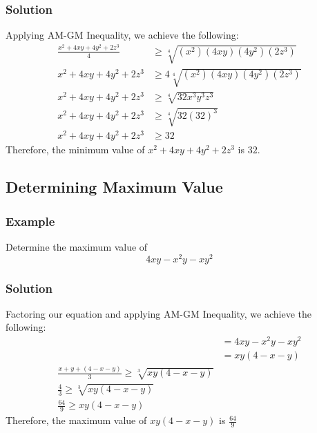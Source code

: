 \documentclass[12pt]{article}
\begin{document}
\subsubsection*{Solution}
Applying AM-GM Inequality, we achieve the following:
\begin{align*}
    \frac{x^2 + 4xy + 4y^2 + 2z^3}{4} &\geq \sqrt[4]{(x^2)(4xy)(4y^2)(2z^3)} \\
    x^2 + 4xy + 4y^2 + 2z^3 &\geq 4 \sqrt[4]{(x^2)(4xy)(4y^2)(2z^3)} \\
    x^2 + 4xy + 4y^2 + 2z^3 &\geq \sqrt[4]{32x^3y^3z^3} \\
    x^2 + 4xy + 4y^2 + 2z^3 &\geq \sqrt[4]{32(32)^3} \\
    x^2 + 4xy + 4y^2 + 2z^3 &\geq 32
\end{align*}
Therefore, the minimum value of $x^2 + 4xy + 4y^2 + 2z^3$ is $32$.

\subsection{Determining Maximum Value}
\subsubsection*{Example}
Determine the maximum value of $$4xy - x^2y - xy^2$$

\subsubsection*{Solution}
Factoring our equation and applying AM-GM Inequality, we achieve the following:
\begin{align*}
    &= 4xy - x^2y - xy^2 \\
    &= xy(4 - x - y) \\
    \frac{x + y + (4 - x - y)}{3} \geq \sqrt[3]{xy(4 - x - y)} \\
    \frac{4}{3} \geq \sqrt[3]{xy(4 - x - y)} \\
    \frac{64}{9} \geq xy(4 - x - y)
\end{align*}
Therefore, the maximum value of $xy(4 - x - y)$ is $\frac{64}{9}$
\end{document}
